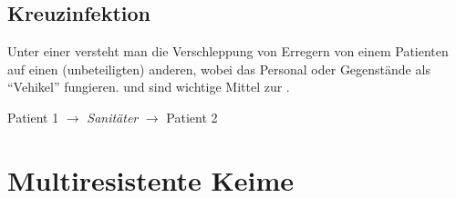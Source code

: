 \subsection{Kreuzinfektion}
\label{topic:kreuzinfektion}

{%
Unter einer  versteht man die Verschleppung von Erregern von
einem Patienten auf einen (unbeteiligten) anderen, wobei das Personal oder
Gegenstände als "`Vehikel"' fungieren.  und
 sind wichtige Mittel zur .

}{
Patient 1 ${\rightarrow}$ \emph{Sanitäter} ${\rightarrow}$ Patient 2
}{}{}{}






\section{Multiresistente Keime}
\label{topic:multiresistente-keime}


